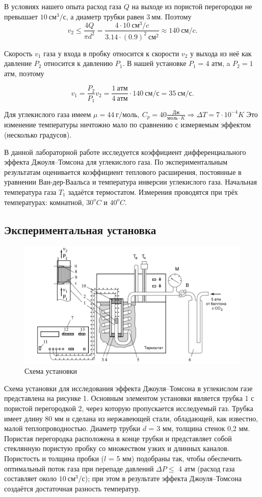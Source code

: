 \documentclass[12pt,a4paper]{article}
\begin{document}
В условиях нашего опыта расход газа $Q$ на выходе из пористой перегородки не превышает $10\ см^3/с$, а диаметр трубки равен $3\ мм$. Поэтому
\begin{equation*}
    v_2 \le \frac{4Q}{\pi d^2} = \frac{4\cdot 10\ см^3/c}{3.14 \cdot (0.9)^2\ см^2} \approx 140\ см/c.
\end{equation*}

Скорость $v_1$ газа у входа в пробку относится к скорости $v_2$ у выхода из неё как давление $P_2$ относится к давлению $P_1$. 
В нашей установке $P_1 = 4$ атм, a $P_2 = 1$ атм, поэтому

\begin{equation*}
    v_1 = \frac {P_2}{P_1}v_2 = \frac{1\ атм}{4\ атм} \cdot 140\ см/с=35\ см/с.
\end{equation*}

Для углекислого газа имеем $\mu = 44\ г/моль,\ C_p = 40 \frac{Дж}{моль\cdot K} \Rightarrow \Delta T = 7\cdot 10^{-4} K$
Это изменение температуры ничтожно мало по сравнению с измеряемым эффектом (несколько градусов).

В данной лабораторной работе исследуется коэффициент дифференциального эффекта Джоуля–Томсона для углекислого газа. 
По экспериментальным результатам оценивается коэффициент теплового расширения, постоянные в уравнении Ван-дер-Ваальса и температура инверсии углекислого газа. 
Начальная температура газа $T_1$ задаётся термостатом. 
Измерения проводятся при трёх температурах: комнатной, $30^oC$ и $40^oC$.

\subsection*{Экспериментальная установка}
\begin{figure}[htp]
    \centering
    \includegraphics[width=0.7\linewidth]{scheme.png}
    \caption{Схема установки}
\end{figure}
Схема установки для исследования эффекта Джоуля–Томсона в углекислом газе представлена на рисунке 1. 
Основным элементом установки является трубка 1 с пористой перегородкой 2, через которую пропускается исследуемый газ. 
Трубка имеет длину 80 мм и сделана из нержавеющей стали, обладающей, как известно, малой теплопроводностью. 
Диаметр трубки $d$ = 3 мм, толщина стенок 0,2 мм. Пористая перегородка расположена в конце трубки и представляет собой стеклянную пористую пробку со множеством узких и длинных каналов. 
Пористость и толщина пробки ($l$ = 5 мм) подобраны так, чтобы обеспечить оптимальный поток газа при перепаде давлений $\Delta P \le$ 4 атм (расход газа составляет около $10\ см^3/с$); 
при этом в результате эффекта Джоуля–Томсона создаётся достаточная разность температур.
\end{document}
